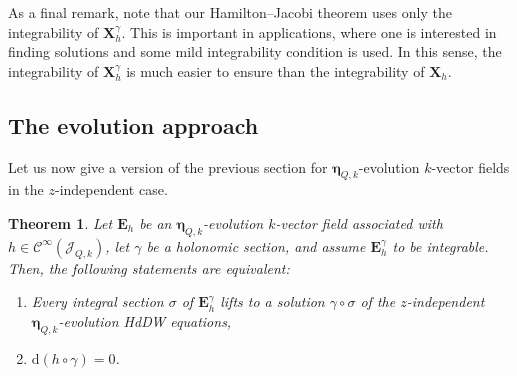 \documentclass[11pt,twoside]{article}
\theoremstyle{plain}
\newtheorem{theorem}{Theorem}[section]
\theoremstyle{definition}
\theoremstyle{remark}
\newcommand{\dd}{\mathrm{d}}
\newcommand{\Cinfty}{\mathscr{C}^\infty}
\begin{document}
As a final remark, note that our Hamilton--Jacobi theorem uses only the integrability of ${\bm X}_h^\gamma$. This is important in applications, where one is interested in finding solutions and some mild integrability condition is used. In this sense, the integrability of ${\bm X}_h^\gamma$ is much easier to ensure than the integrability of ${\bm X}_h$. 

\subsection{The evolution approach}
\label{sec:zindevolution}

Let us now give a version of the previous section for ${\bm \eta}_{Q,k}$-evolution $k$-vector fields in the $z$-independent case. 


\begin{theorem}\label{theo:evolutionHJzindependent}
Let $\mathbf{E}_h$ be an ${\bm \eta}_{Q,k}$-evolution $k$-vector field associated with $h\in \Cinfty(\mathcal{J}_{Q,k})$, let $\gamma$ be a holonomic section, and assume $\mathbf{E}_h^\gamma$ to be integrable. Then, the following statements are equivalent:
\begin{enumerate}
\item Every integral section $\sigma$ of $\mathbf{E}_h^\gamma$ lifts to a solution $\gamma\circ\sigma$ of the $z$-independent ${\bm \eta}_{Q,k}$-evolution HdDW equations,
\item $\dd(h\circ\gamma)=0$.
\end{enumerate}
\end{theorem}
\end{document}
